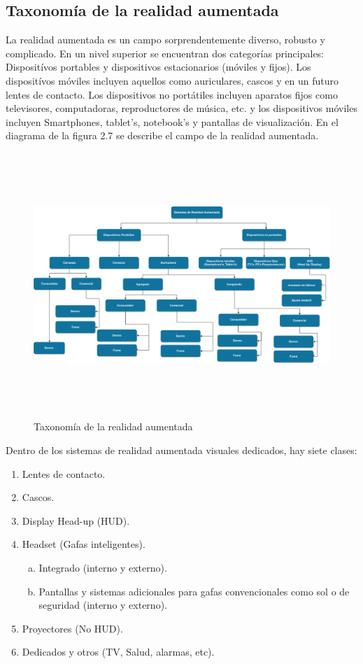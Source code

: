 \subsection{Taxonomía de la realidad aumentada}
La realidad aumentada es un campo sorprendentemente diverso, robusto y complicado. En un nivel superior se encuentran dos categorías principales: Dispositívos portables y dispositivos estacionarios (móviles y fijos).
Los dispositívos móviles incluyen aquellos como auriculares, cascos y en un futuro lentes de contacto. Los dispositivos no portátiles incluyen aparatos fijos como televisores, computadoras, reproductores de música, etc. y los dispositivos móviles incluyen Smartphones, tablet's, notebook's y pantallas de visualización. En el diagrama de la figura 2.7 se describe el campo de la realidad aumentada\cite{B22}. \par
\vspace{5mm}
\begin{figure}[h!]
	\centering
	\includegraphics[width=17cm,height=10cm]{imagenes/marcoteorico/ar/taxonomiaAR.png}
	\caption{Taxonomía de la realidad aumentada\cite{B22}}
	\label{fig:analogo}
\end{figure}

Dentro de los sistemas de realidad aumentada visuales dedicados, hay siete clases:\cite{B22} \par
\vspace{5mm}
\begin{enumerate}[1.]
	\item Lentes de contacto.
	\item Cascos.
	\item Display Head-up (HUD).
	\item Headset (Gafas inteligentes).
	\begin{enumerate}[a)]
		\item Integrado (interno y externo).
		\item Pantallas y sistemas adicionales para gafas convencionales como sol o de seguridad (interno y externo).
	\end{enumerate}
	\item Proyectores (No HUD).
	\item Dedicados y otros (TV, Salud, alarmas, etc).

\end{enumerate}

